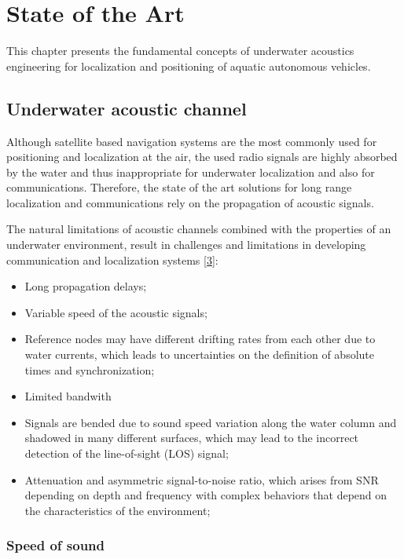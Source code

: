 \chapter{State of the Art} \label{chap:sota}

This chapter presents the fundamental concepts of underwater acoustics engineering for localization and positioning of aquatic autonomous vehicles.

\section{Underwater acoustic channel} \label{sec:acoustchann}

Although satellite based navigation systems are the most commonly used for positioning and localization at the air, the used radio signals are highly absorbed by the water and thus inappropriate for underwater localization and also for communications. Therefore, the state of the art solutions for long range localization and communications rely on the propagation of acoustic signals.

The natural limitations of acoustic channels combined with the properties of an underwater environment, result in challenges and limitations in developing communication and localization systems [\hyperref[r:ocean-acoust]{3}]:
\begin{itemize}
	\item Long propagation delays;
	\item Variable speed of the acoustic signals;
	\item Reference nodes may have different drifting rates from each other due to water currents, which leads to uncertainties on the definition of absolute times and synchronization;
	\item Limited bandwith
	\item Signals are bended due to sound speed variation along the water column and shadowed in many different surfaces, which may lead to the incorrect detection of the line-of-sight (LOS) signal;
	\item Attenuation and asymmetric signal-to-noise ratio, which arises from SNR depending on depth and frequency with complex behaviors that depend on the characteristics of the environment;
\end{itemize}

\subsection{Speed of sound} \label{subsec: speed-sound}

